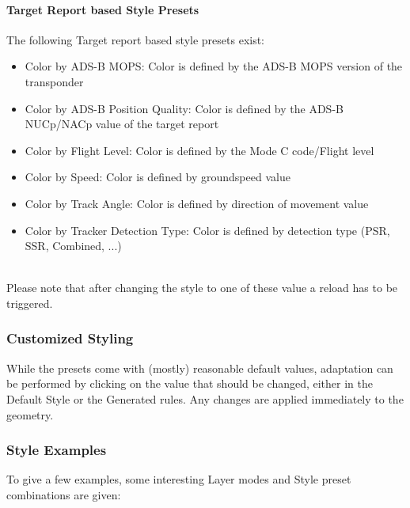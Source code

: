\paragraph{Target Report based Style Presets}
The following Target report based style presets exist:
\begin{itemize}
 \item Color by ADS-B MOPS: Color is defined by the ADS-B MOPS version of the transponder
 \item Color by ADS-B Position Quality: Color is defined by the ADS-B NUCp/NACp value of the target report
 \item Color by Flight Level: Color is defined by the Mode C code/Flight level
 \item Color by Speed: Color is defined by groundspeed value
 \item Color by Track Angle: Color is defined by direction of movement value
 \item Color by Tracker Detection Type: Color is defined by detection type (PSR, SSR, Combined, ...)
\end{itemize}
\  \\

Please note that after changing the style to one of these value a reload has to be triggered. \\

\subsubsection{Customized Styling}

While the presets come with (mostly) reasonable default values, adaptation can be performed by clicking on the value that should be changed, either in the Default Style or the Generated rules. Any changes are applied immediately to the geometry.

\subsubsection{Style Examples}

To give a few examples, some interesting Layer modes and Style preset combinations are given:

